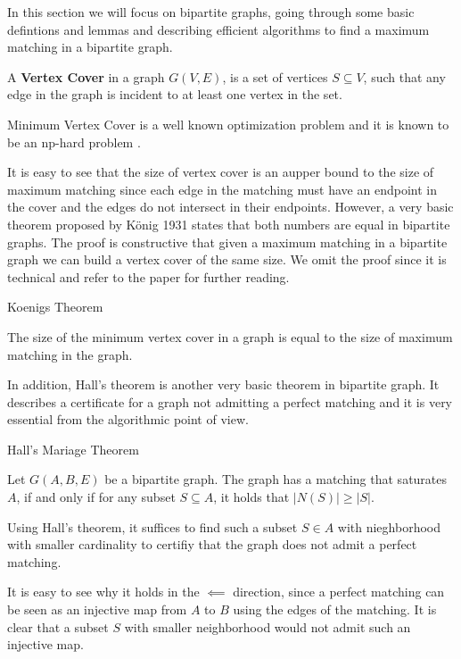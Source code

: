In this section we will focus on bipartite graphs, going through some basic defintions and lemmas and describing efficient algorithms to find a maximum matching in a bipartite graph.
\begin{definition}
	A \textbf{Vertex Cover} in a graph $G(V, E)$, is a set of vertices $S \subseteq V$, such that any edge in the graph is incident to at least one vertex in the set.
\end{definition}
Minimum Vertex Cover is a well known optimization problem and it is known to be an np-hard problem \cite{karp1972reducibility}.

It is easy to see that the size of vertex cover is an aupper bound to the size of maximum matching since each edge in the matching must have an endpoint in the cover and the edges do not intersect in their endpoints. However, a very basic theorem proposed by König 1931 \cite{konig1931graphen} states that both numbers are equal in bipartite graphs. The proof is constructive that given a maximum matching in a bipartite graph we can build  a vertex cover of the same size. We omit the proof since it is technical and refer to the paper for further reading.

\begin{theorem}Koenigs Theorem

	The size of the minimum vertex cover in a graph is equal to the size of maximum matching in the graph.
\end{theorem}

In addition, Hall's theorem is another very basic theorem in bipartite graph. It describes a certificate for a graph not admitting a perfect matching and it is very essential from the algorithmic point of view.
\begin{theorem}Hall's Mariage Theorem

	Let $G(A, B, E)$ be a bipartite graph. The graph has a matching that saturates $A$, if and only if for any subset $S \subseteq A$, it holds that $|N(S)| \geq |S|$.
\end{theorem}
Using Hall's theorem, it suffices to find such a subset $S \in A$ with nieghborhood with smaller cardinality to certifiy that the graph does not admit a perfect matching.

It is easy to see why it holds in the $\impliedby$ direction, since a perfect matching can be seen as an injective map from $A$ to $B$ using the edges of the matching. It is clear that a subset $S$ with smaller neighborhood would not admit such an injective map.

